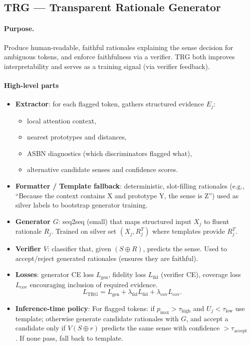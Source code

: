 \documentclass[11pt]{article}
\begin{document}
\subsection{TRG — Transparent Rationale Generator}
\paragraph{Purpose.} Produce human-readable, faithful rationales explaining the sense decision for ambiguous tokens, and enforce faithfulness via a verifier. TRG both improves interpretability and serves as a training signal (via verifier feedback).

\paragraph{High-level parts}
\begin{itemize}
  \item \textbf{Extractor}: for each flagged token, gathers structured evidence $E_j$:
    \begin{itemize}
      \item local attention context,
      \item nearest prototypes and distances,
      \item ASBN diagnostics (which discriminators flagged what),
      \item alternative candidate senses and confidence scores.
    \end{itemize}
  \item \textbf{Formatter / Template fallback}: deterministic, slot-filling rationales (e.g., ``Because the context contains X and prototype Y, the sense is Z'') used as silver labels to bootstrap generator training.
  \item \textbf{Generator $G$}: seq2seq (small) that maps structured input $X_j$ to fluent rationale $R_j$. Trained on silver set $(X_j,R_j^{T})$ where templates provide $R_j^{T}$.
  \item \textbf{Verifier $V$}: classifier that, given $(S\oplus R)$, predicts the sense. Used to accept/reject generated rationales (ensures they are faithful).
  \item \textbf{Losses}: generator CE loss $L_{\text{gen}}$, fidelity loss $L_{\text{fid}}$ (verifier CE), coverage loss $L_{\text{cov}}$ encouraging inclusion of required evidence.
    \[
    L_{\text{TRG}}=L_{\text{gen}}+\lambda_{\text{fid}}L_{\text{fid}}+\lambda_{\text{cov}}L_{\text{cov}}.
    \]
  \item \textbf{Inference-time policy}: For flagged tokens: if $p_{\max}>\tau_{\text{high}}$ and $U_j<\tau_{\text{low}}$ use template; otherwise generate candidate rationales with $G$, and accept a candidate only if $V(S\oplus r)$ predicts the same sense with confidence $>\tau_{\text{accept}}$. If none pass, fall back to template.
\end{itemize}
\end{document}
